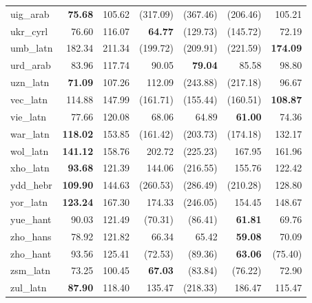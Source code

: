 \documentclass[11pt]{article}
\begin{document}
\begin{center}
\begin{longtable}[width=0.9\textwidth]{|l|rrrrrr|}
uig\_arab & \textbf{75.68} & 105.62 & (317.09) & (367.46) & (206.46) & 105.21 \\ 
ukr\_cyrl & 76.60 & 116.07 & \textbf{64.77} & (129.73) & (145.72) & 72.19 \\ 
umb\_latn & 182.34 & 211.34 & (199.72) & (209.91) & (221.59) & \textbf{174.09} \\ 
urd\_arab & 83.96 & 117.74 & 90.05 & \textbf{79.04} & 85.58 & 98.80 \\ 
uzn\_latn & \textbf{71.09} & 107.26 & 112.09 & (243.88) & (217.18) & 96.67 \\ 
vec\_latn & 114.88 & 147.99 & (161.71) & (155.44) & (160.51) & \textbf{108.87} \\ 
vie\_latn & 77.66 & 120.08 & 68.06 & 64.89 & \textbf{61.00} & 74.36 \\ 
war\_latn & \textbf{118.02} & 153.85 & (161.42) & (203.73) & (174.18) & 132.17 \\ 
wol\_latn & \textbf{141.12} & 158.76 & 202.72 & (225.23) & 167.95 & 161.96 \\ 
xho\_latn & \textbf{93.68} & 121.39 & 144.06 & (216.55) & 155.76 & 122.42 \\ 
ydd\_hebr & \textbf{109.90} & 144.63 & (260.53) & (286.49) & (210.28) & 128.80 \\ 
yor\_latn & \textbf{123.24} & 167.30 & 174.33 & (246.05) & 154.45 & 148.67 \\ 
yue\_hant & 90.03 & 121.49 & (70.31) & (86.41) & \textbf{61.81} & 69.76 \\ 
zho\_hans & 78.92 & 121.82 & 66.34 & 65.42 & \textbf{59.08} & 70.09 \\ 
zho\_hant & 93.56 & 125.41 & (72.53) & (89.36) & \textbf{63.06} & (75.40) \\ 
zsm\_latn & 73.25 & 100.45 & \textbf{67.03} & (83.84) & (76.22) & 72.90 \\ 
zul\_latn & \textbf{87.90} & 118.40 & 135.47 & (218.33) & 186.47 & 115.47 \\ 
\end{longtable}
\end{center}
\end{document}
